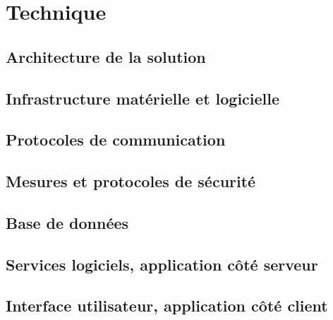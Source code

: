 \section{Technique}


\subsection{Architecture de la solution}

\subsection{Infrastructure matérielle et logicielle}

\subsection{Protocoles de communication}

\subsection{Mesures et protocoles de sécurité}

\subsection{Base de données}

\subsection{Services logiciels, application côté serveur}

\subsection{Interface utilisateur, application côté client}
